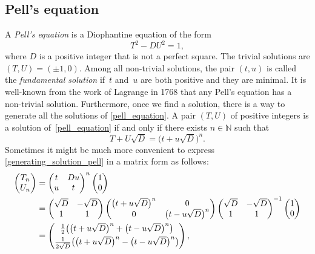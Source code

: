 \documentclass[pdftex]{sigma}
\numberwithin{equation}{section}
\begin{document}
\subsection{Pell's equation}
A \textit{Pell's equation} is a Diophantine equation of the form
\begin{equation}\label{pell_equation}
	T^2-DU^2=1,
\end{equation}
where $ D $ is a positive integer that is not a perfect square. The trivial solutions are $ (T,U)=(\pm1,0) $. Among all non-trivial solutions, the pair $ (t,u) $ is called the \textit{fundamental solution} if~$ t $ and~$ u $ are both positive and they are minimal. It is well-known from the work of Lagrange in 1768 that any Pell's equation has a non-trivial solution. Furthermore, once we find a solution, there is a way to generate all the solutions of \eqref{pell_equation}. A pair $ (T,U) $ of positive integers is a solution of~\eqref{pell_equation} if and only if there exists $ n\in \mathbb{N} $ such that
\begin{equation}\label{generating_solution_pell}
	T+U\sqrt{D}=\big(t+u\sqrt{D}\big)^n.
\end{equation}
Sometimes it might be much more convenient to express \eqref{generating_solution_pell} in a matrix form as follows:
\begin{align*}
		\begin{pmatrix}
			T_n\\U_n
		\end{pmatrix}&=\begin{pmatrix}
			t&Du\\
			u&t
		\end{pmatrix}^n\begin{pmatrix}
			1\\0
		\end{pmatrix}\\
		&=\begin{pmatrix}
			\sqrt{D}&-\sqrt{D}\\
			1&1
		\end{pmatrix}\begin{pmatrix}
			\big(t+u\sqrt{D}\big)^n&0\\
			0&\big(t-u\sqrt{D}\big)^n
		\end{pmatrix}\begin{pmatrix}
			\sqrt{D}&-\sqrt{D}\\
			1&1
		\end{pmatrix}^{-1}\begin{pmatrix}
			1\\0
		\end{pmatrix}\\
		&=\begin{pmatrix}
			\frac{1}{2}\big(\big(t+u\sqrt{D}\big)^n+\big(t-u\sqrt{D}\big)^n\big)\vspace{1mm}\\
			\frac{1}{2\sqrt{D}}\big(\big(t+u\sqrt{D}\big)^n-\big(t-u\sqrt{D}\big)^n\big)
		\end{pmatrix},
	\end{align*}
\end{document}
